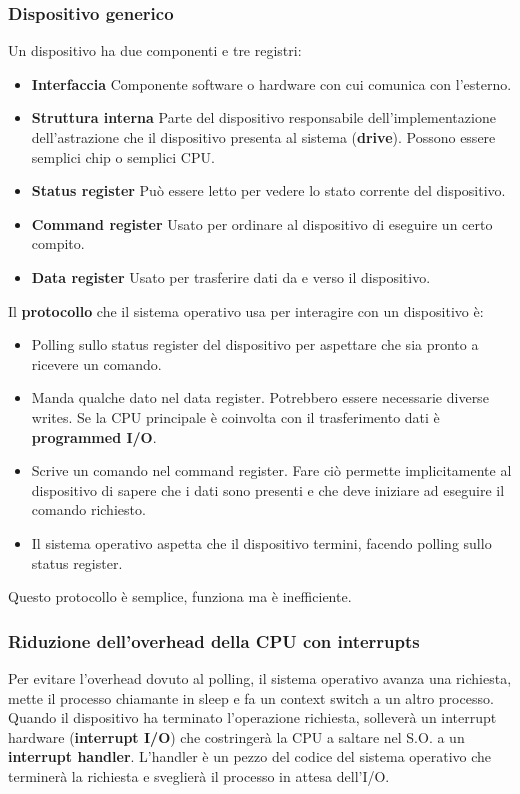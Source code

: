 \documentclass[12pt, twoside, letterpaper]{article}
\begin{document}
			\subsubsection{Dispositivo generico}
				Un dispositivo ha due componenti e tre registri: 
				\begin{itemize}
					\item \textbf{Interfaccia} Componente software o hardware con cui comunica con l'esterno.
					\item \textbf{Struttura interna} Parte del dispositivo responsabile dell'implementazione dell'astrazione che il dispositivo presenta al sistema (\textbf{drive}). Possono essere semplici chip o semplici CPU. 
					\item \textbf{Status register} Può essere letto per vedere lo stato corrente del dispositivo.
					\item \textbf{Command register} Usato per ordinare al dispositivo di eseguire un certo compito.
					\item \textbf{Data register} Usato per trasferire dati da e verso il dispositivo. 
				\end{itemize}
				Il \textbf{protocollo} che il sistema operativo usa per interagire con un dispositivo è:
				\begin{itemize}
					\item Polling sullo status register del dispositivo per aspettare che sia pronto a ricevere un comando. 
					\item Manda qualche dato nel data register. Potrebbero essere necessarie diverse writes. Se la CPU principale è coinvolta con il trasferimento dati  è \textbf{programmed I/O}.
					\item Scrive un comando nel command register. Fare ciò permette implicitamente al dispositivo di sapere che i dati sono presenti e che deve iniziare ad eseguire il comando richiesto.
					\item Il sistema operativo aspetta che il dispositivo termini, facendo polling sullo status register.
				\end{itemize}
				Questo protocollo è semplice, funziona ma è inefficiente. 
				
			\subsubsection{Riduzione dell'overhead della CPU con interrupts}
				Per evitare l'overhead dovuto al polling, il sistema operativo avanza una richiesta, mette il processo chiamante in sleep e fa un context switch a un altro processo. Quando il dispositivo ha terminato l'operazione richiesta, solleverà un interrupt hardware (\textbf{interrupt I/O}) che costringerà la CPU a saltare nel S.O. a un \textbf{interrupt handler}. L'handler è un pezzo del codice del sistema operativo che terminerà la richiesta e sveglierà il processo in attesa dell'I/O. 
				
\end{document}
